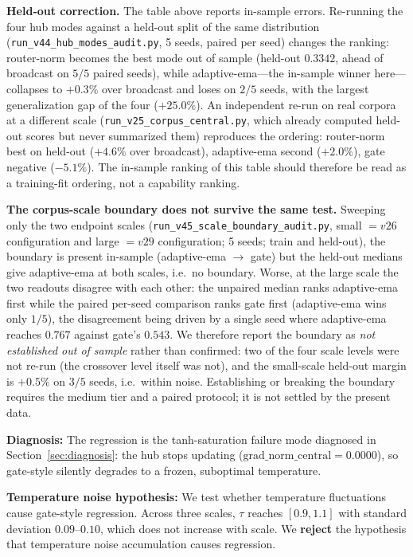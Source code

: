 \documentclass[10pt,twoside]{article}
\theoremstyle{definition}
\begin{document}
\textbf{Held-out correction.} The table above reports in-sample errors. Re-running the four hub modes against a held-out split of the same distribution (\texttt{run\_v44\_hub\_modes\_audit.py}, 5 seeds, paired per seed) changes the ranking: router-norm becomes the best mode out of sample (held-out $0.3342$, ahead of broadcast on $5/5$ paired seeds), while adaptive-ema---the in-sample winner here---collapses to $+0.3\%$ over broadcast and loses on $2/5$ seeds, with the largest generalization gap of the four ($+25.0\%$). An independent re-run on real corpora at a different scale (\texttt{run\_v25\_corpus\_central.py}, which already computed held-out scores but never summarized them) reproduces the ordering: router-norm best on held-out ($+4.6\%$ over broadcast), adaptive-ema second ($+2.0\%$), gate negative ($-5.1\%$). The in-sample ranking of this table should therefore be read as a training-fit ordering, not a capability ranking.

\textbf{The corpus-scale boundary does not survive the same test.} Sweeping only the two endpoint scales (\texttt{run\_v45\_scale\_boundary\_audit.py}, small $=v26$ configuration and large $=v29$ configuration; 5 seeds; train and held-out), the boundary is present in-sample (adaptive-ema $\rightarrow$ gate) but the held-out medians give adaptive-ema at both scales, i.e.\ no boundary. Worse, at the large scale the two readouts disagree with each other: the unpaired median ranks adaptive-ema first while the paired per-seed comparison ranks gate first (adaptive-ema wins only $1/5$), the disagreement being driven by a single seed where adaptive-ema reaches $0.767$ against gate's $0.543$. We therefore report the boundary as \emph{not established out of sample} rather than confirmed: two of the four scale levels were not re-run (the crossover level itself was not), and the small-scale held-out margin is $+0.5\%$ on $3/5$ seeds, i.e.\ within noise. Establishing or breaking the boundary requires the medium tier and a paired protocol; it is not settled by the present data.

\textbf{Diagnosis:} The regression is the tanh-saturation failure mode diagnosed in Section~\ref{sec:diagnosis}: the hub stops updating ($\text{grad\_norm\_central} = 0.0000$), so gate-style silently degrades to a frozen, suboptimal temperature.

\textbf{Temperature noise hypothesis:} We test whether temperature fluctuations cause gate-style regression. Across three scales, $\tau$ reaches $[0.9, 1.1]$ with standard deviation $0.09$--$0.10$, which does not increase with scale. We \textbf{reject} the hypothesis that temperature noise accumulation causes regression.
\end{document}
